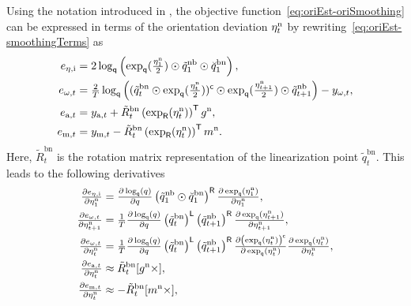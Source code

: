 Using the notation introduced in , the objective function~\eqref{eq:oriEst-oriSmoothing} can be expressed in terms of the orientation deviation $\eta_t^\text{n}$ by rewriting~\eqref{eq:oriEst-smoothingTerms} as
\begin{subequations}
\label{eq:oriEst-cost}
\begin{align}
e_{\eta,\text{i}} &=  2 \log_\mathsf{q} \left( \exp_\mathsf{q} (\tfrac{\eta_{1}^\text{n}}{2}) \odot \tilde{q}_1^\text{nb} \odot \breve{q}_1^\text{bn} \right), \\
e_{\omega,t} &= \tfrac{2}{T} \log_\mathsf{q} \left( (\tilde{q}_t^\text{bn} \odot \exp_\mathsf{q}( {\tfrac{\eta_t^\text{n}}{2}}) )^{\mathsf{c}} \odot \exp_\mathsf{q} ({\tfrac{\eta_{t+1}^\text{n}}{2}}) \odot \tilde{q}^\text{nb}_{t+1} \right) - y_{\omega,t}, \\
e_{\text{a},t} &= y_{\text{a},t} + \tilde{R}^\text{bn}_t \left( \exp_\mathsf{R}( \eta_t^\text{n} ) \right)^{\mathsf{T}} g^\text{n}, \label{eq:oriEst-costAcc} \\
e_{\text{m},t} &= y_{\text{m},t} - \tilde{R}^\text{bn}_t \left( \exp_\mathsf{R}( \eta_t^\text{n} ) \right)^{\mathsf{T}} m^\text{n}. \label{eq:oriEst-costMag}
\end{align}
\end{subequations}
Here, $\tilde{R}^\text{bn}_t$ is the rotation matrix representation of the linearization point $\tilde{q}^\text{bn}_t$. This leads to the following derivatives
\begin{subequations}
\label{eq:oriEst-der}
\begin{align}
\tfrac{\partial e_{\eta,\text{i}} }{\partial \eta_{1}^\text{n}}  &=  \tfrac{\partial \log_\mathsf{q} (q)}{\partial q} \left( \tilde{q}^\text{nb}_{1} \odot \breve{q}_1^\text{bn}\right)^{\mathsf{R}} \tfrac{\partial \exp_\mathsf{q} (\eta_{1}^\text{n})}{\partial \eta_{1}^\text{n}}, \label{eq:oriEst-derInit} \\
\tfrac{\partial e_{\omega,t} }{\partial \eta_{t+1}^\text{n}} &= \tfrac{1}{T} \tfrac{\partial \log_\mathsf{q} (q)}{\partial q} \left( \tilde{q}_t^\text{bn} \right)^{\mathsf{L}} \left( \tilde{q}^\text{nb}_{t+1}\right)^{\mathsf{R}} \tfrac{\partial \exp_\mathsf{q} (\eta_{t+1}^\text{n})}{\partial \eta_{t+1}^\text{n}}, \label{eq:oriEst-derDynModelNow} \\
\tfrac{\partial e_{\omega,t} }{\partial \eta_t^\text{n}} &= \tfrac{1}{T} \tfrac{\partial \log_\mathsf{q} (q)}{\partial q} \left( \tilde{q}_t^\text{bn} \right)^{\mathsf{L}} \left( \tilde{q}^\text{nb}_{t+1} \right)^{\mathsf{R}} \tfrac{\partial \left( \exp_\mathsf{q}  (\eta_{t}^\text{n}) \right)^{\mathsf{c}}}{\partial \exp_\mathsf{q} (\eta_{t}^\text{n})} \tfrac{\partial \exp_\mathsf{q} (\eta_{t}^\text{n})}{\partial \eta_{t}^\text{n}}, \label{eq:oriEst-derDynModelPrev} \\
\tfrac{\partial e_{\text{a},t} }{\partial \eta_t^\text{n}}&\approx \tilde{R}^\text{bn}_t [g^\text{n} \times], \label{eq:oriEst-derAcc} \\
\tfrac{\partial e_{\text{m},t} }{\partial \eta_t^\text{n}} &\approx - \tilde{R}^\text{bn}_t [m^\text{n} \times], \label{eq:oriEst-derMag}
\end{align}
\end{subequations}

